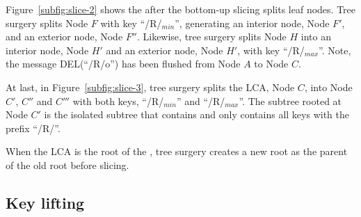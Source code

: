 Figure~\ref{subfig:slice-2} shows the \bet after the bottom-up slicing splits
leaf nodes.
Tree surgery splits Node $F$ with key ``/R/$_{min}$'', generating an interior
node, Node $F'$, and an exterior node, Node $F''$.
Likewise, tree surgery splits Node $H$ into an interior node, Node $H'$ and
an exterior node, Node $H'$, with key ``/R/$_{max}$''.
Note, the message DEL(``/R/o'') has been flushed from Node $A$ to Node $C$.

At last, in Figure~\ref{subfig:slice-3}, tree surgery splits the LCA, Node $C$,
into Node $C'$, $C''$ and $C'''$ with both keys, ``/R/$_{min}$'' and
``/R/$_{max}$''.
The subtree rooted at Node $C'$ is the isolated subtree that contains and
only contains all keys with the prefix ``/R/''.

When the LCA is the root of the \bet, tree surgery creates a new root as the
parent of the old root before slicing.

\subsection{Key lifting}

